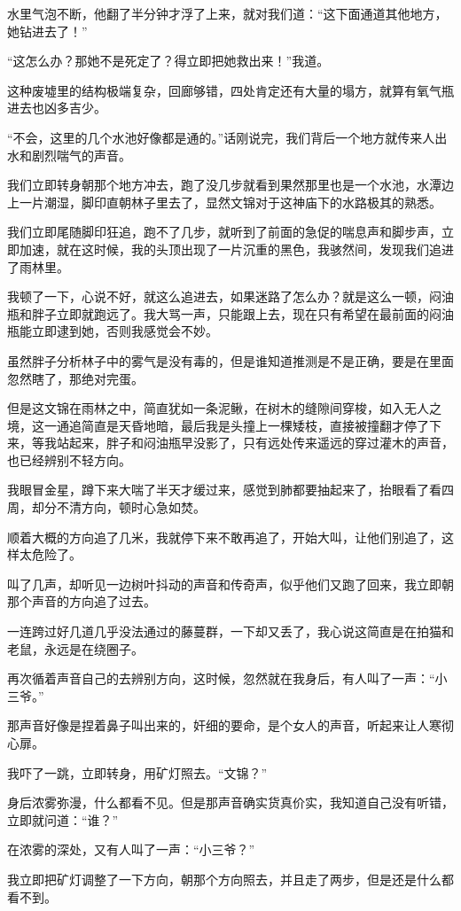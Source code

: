 水里气泡不断，他翻了半分钟才浮了上来，就对我们道：“这下面通道其他地方，她钻进去了！”

“这怎么办？那她不是死定了？得立即把她救出来！”我道。

这种废墟里的结构极端复杂，回廊够错，四处肯定还有大量的塌方，就算有氧气瓶进去也凶多吉少。

“不会，这里的几个水池好像都是通的。”话刚说完，我们背后一个地方就传来人出水和剧烈喘气的声音。

我们立即转身朝那个地方冲去，跑了没几步就看到果然那里也是一个水池，水潭边上一片潮湿，脚印直朝林子里去了，显然文锦对于这神庙下的水路极其的熟悉。

我们立即尾随脚印狂追，跑不了几步，就听到了前面的急促的喘息声和脚步声，立即加速，就在这时候，我的头顶出现了一片沉重的黑色，我骇然间，发现我们追进了雨林里。

我顿了一下，心说不好，就这么追进去，如果迷路了怎么办？就是这么一顿，闷油瓶和胖子立即就跑远了。我大骂一声，只能跟上去，现在只有希望在最前面的闷油瓶能立即逮到她，否则我感觉会不妙。

虽然胖子分析林子中的雾气是没有毒的，但是谁知道推测是不是正确，要是在里面忽然瞎了，那绝对完蛋。

但是这文锦在雨林之中，简直犹如一条泥鳅，在树木的缝隙间穿梭，如入无人之境，这一通追简直是天昏地暗，最后我是头撞上一棵矮枝，直接被撞翻才停了下来，等我站起来，胖子和闷油瓶早没影了，只有远处传来遥远的穿过灌木的声音，也已经辨别不轻方向。

我眼冒金星，蹲下来大喘了半天才缓过来，感觉到肺都要抽起来了，抬眼看了看四周，却分不清方向，顿时心急如焚。

顺着大概的方向追了几米，我就停下来不敢再追了，开始大叫，让他们别追了，这样太危险了。

叫了几声，却听见一边树叶抖动的声音和传奇声，似乎他们又跑了回来，我立即朝那个声音的方向追了过去。

一连跨过好几道几乎没法通过的藤蔓群，一下却又丢了，我心说这简直是在拍猫和老鼠，永远是在绕圈子。

再次循着声音自己的去辨别方向，这时候，忽然就在我身后，有人叫了一声：“小三爷。”

那声音好像是捏着鼻子叫出来的，奸细的要命，是个女人的声音，听起来让人寒彻心扉。

我吓了一跳，立即转身，用矿灯照去。“文锦？”

身后浓雾弥漫，什么都看不见。但是那声音确实货真价实，我知道自己没有听错，立即就问道：“谁？”

在浓雾的深处，又有人叫了一声：“小三爷？”

我立即把矿灯调整了一下方向，朝那个方向照去，并且走了两步，但是还是什么都看不到。

